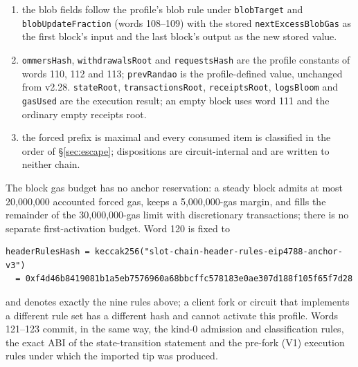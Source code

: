 \documentclass[a4paper,11pt]{article}
\newcommand{\code}[1]{\nolinkurl{#1}}
\begin{document}
\begin{enumerate}
  the new stored value.
\item the blob fields follow the profile's blob rule under \code{blobTarget}
  and \code{blobUpdateFraction} (words 108--109) with the stored
  \code{nextExcessBlobGas} as the first block's input and the last block's
  output as the new stored value.
\item \code{ommersHash}, \code{withdrawalsRoot} and \code{requestsHash} are
  the profile constants of words 110, 112 and 113; \code{prevRandao} is the
  profile-defined value, unchanged from v2.28.  \code{stateRoot},
  \code{transactionsRoot}, \code{receiptsRoot}, \code{logsBloom} and
  \code{gasUsed} are the execution result; an empty block uses word 111 and
  the ordinary empty receipts root.
\item the forced prefix is maximal and every consumed item is classified in
  the order of \S\ref{sec:escape}; dispositions are circuit-internal and are
  written to neither chain.
\end{enumerate}
The block gas budget has no anchor reservation: a steady block admits at
most 20,000,000 accounted forced gas, keeps a 5,000,000-gas margin, and fills
the remainder of the 30,000,000-gas limit with discretionary transactions;
there is no separate first-activation budget.  Word 120 is fixed to
\begin{verbatim}
headerRulesHash = keccak256("slot-chain-header-rules-eip4788-anchor-v3")
  = 0xf4d46b8419081b1a5eb7576960a68bbcffc578183e0ae307d188f105f65f7d28
\end{verbatim}
and denotes exactly the nine rules above; a client fork or circuit that
implements a different rule set has a different hash and cannot activate this
profile.  Words 121--123 commit, in the same way, the kind-0 admission and
classification rules, the exact ABI of the state-transition statement and the
pre-fork (V1) execution rules under which the imported tip was produced.
\end{document}
